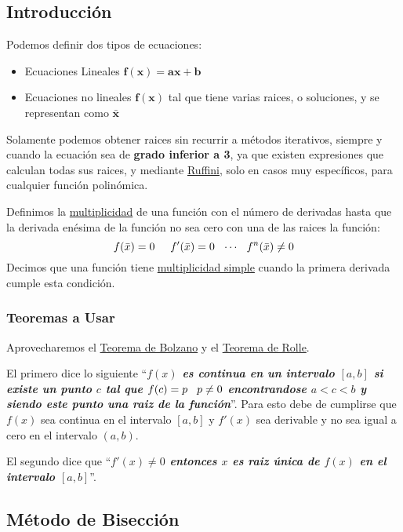\subsection{Introducción}
Podemos definir dos tipos de ecuaciones:
\begin{itemize}
        \item Ecuaciones Lineales \(\mathbf{f(x) = ax +b}\)
        \item Ecuaciones no lineales \(\mathbf{f(x)}\) tal que tiene varias raices, o soluciones, y se representan como \(\mathbf{\bar{x}}\)
\end{itemize}
Solamente podemos obtener raices sin recurrir a métodos iterativos, siempre y cuando la ecuación sea de \textbf{grado inferior a 3}, ya que existen expresiones que calculan todas sus raices, y mediante \underline{Ruffini}, solo en casos muy específicos, para cualquier función polinómica.
\par
\vspace{.5cm}
Definimos la \underline{multiplicidad} de una función con el número de derivadas hasta que la derivada enésima de la función no sea cero con una de las raices la función:
\[
        f(\bar{x}) = 0 \hspace{5mm}f'(\bar{x}) = 0 \hspace{2.5mm} \cdots \hspace{2.5mm} f^n(\bar{x}) \not = 0
\]
Decimos que una función tiene \underline{multiplicidad simple} cuando la primera derivada cumple esta condición.
\subsubsection{Teoremas a Usar}
Aprovecharemos el \underline{Teorema de Bolzano} y el \underline{Teorema de Rolle}.\par \vspace{5mm}
El primero dice lo siguiente ``\textbf{\textit{\(f(x)\) es continua en un intervalo \([a,b]\) si existe un punto \(c\) tal que \(f(c) = p \hspace{3mm} p \neq 0\) encontrandose \(a < c < b\) y siendo este punto una raiz de la función}}''. Para esto debe de cumplirse que \(f(x)\) sea continua en el intervalo \([a,b]\) y \(f'(x)\) sea derivable y no sea igual a cero en el intervalo \((a,b)\). \par \vspace{3mm}
El segundo dice que ``\textbf{\textit{\(f'(x) \neq 0 \) entonces \(x\) es raiz única de \(f(x)\) en el intervalo \([a,b]\)}}''.
\subsection{Método de Bisección}
